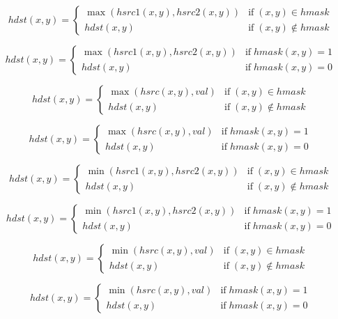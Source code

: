 \documentclass{article}
\begin{document}
{\[ hdst(x,y) = \left\{ \begin{array}{ll} \max ( hsrc1(x,y), hsrc2(x,y) ) & \mathrm{if} \; (x,y) \in hmask \\ hdst(x,y) & \mathrm{if} \; (x,y) \notin hmask \end{array} \right. \]
\pagebreak

\[hdst(x,y) = \left\{ \begin{array}{ll} \max ( hsrc1(x,y), hsrc2(x,y) ) & \mathrm{if} \; hmask(x,y) = 1 \\ hdst(x,y) & \mathrm{if} \; hmask(x,y) = 0 \end{array} \right. \]
\pagebreak

\[ hdst(x,y) = \left\{ \begin{array}{ll} \max ( hsrc(x,y) , val ) & \mathrm{if} \; (x,y) \in hmask \\ hdst(x,y) & \mathrm{if} \; (x,y) \notin hmask \end{array} \right. \]
\pagebreak

\[hdst(x,y) = \left\{ \begin{array}{ll} \max ( hsrc(x,y) , val ) & \mathrm{if} \; hmask(x,y) = 1 \\ hdst(x,y) & \mathrm{if} \; hmask(x,y) = 0 \end{array} \right. \]
\pagebreak

\[ hdst(x,y) = \left\{ \begin{array}{ll} \min ( hsrc1(x,y), hsrc2(x,y) ) & \mathrm{if} \; (x,y) \in hmask \\ hdst(x,y) & \mathrm{if} \; (x,y) \notin hmask \end{array} \right. \]
\pagebreak

\[hdst(x,y) = \left\{ \begin{array}{ll} \min ( hsrc1(x,y), hsrc2(x,y) ) & \mathrm{if} \; hmask(x,y) = 1 \\ hdst(x,y) & \mathrm{if} \; hmask(x,y) = 0 \end{array} \right. \]
\pagebreak

\[ hdst(x,y) = \left\{ \begin{array}{ll} \min ( hsrc(x,y) , val ) & \mathrm{if} \; (x,y) \in hmask \\ hdst(x,y) & \mathrm{if} \; (x,y) \notin hmask \end{array} \right. \]
\pagebreak

\[hdst(x,y) = \left\{ \begin{array}{ll} \min ( hsrc(x,y) , val ) & \mathrm{if} \; hmask(x,y) = 1 \\ hdst(x,y) & \mathrm{if} \; hmask(x,y) = 0 \end{array} \right. \]
\pagebreak

}
\end{document}
